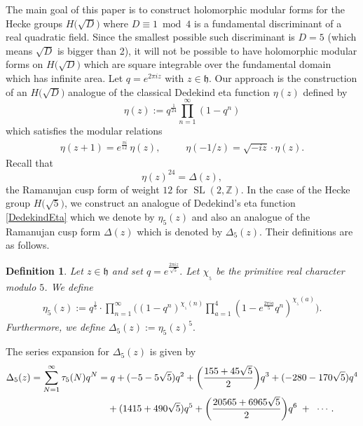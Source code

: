 \documentclass[11pt]{amsart}
\numberwithin{equation}{section}
\newtheorem{defn}[thm]{Definition}
\theoremstyle{remark}
\DeclareMathOperator{\SL}{SL}
\begin{document}
\par
The main goal of this paper is to construct holomorphic modular forms for the Hecke groups $H\big(\sqrt{D}\big)$  where $D\equiv 1 \bmod{4}$ is a fundamental discriminant of a real quadratic field. Since the smallest possible such discriminant is $D=5$ (which means $\sqrt{D}$ is bigger than 2), it will not be possible to have holomorphic modular forms on $H\big(\sqrt{D}\big)$ which are square integrable over the fundamental domain which has infinite area. Let
 $q = e^{2\pi iz}$ with $z\in\mathfrak h$. Our approach is the construction of an $H\big(\sqrt{D}\big)$ analogue of the classical Dedekind eta function $\eta(z)$ defined by
\begin{equation} \label{DedekindEta}
\eta(z) := q^{\frac{1}{24}}\prod_{n=1}^\infty \left(1-q^n \right)
\end{equation}
which satisfies the modular relations
\begin{align}\label{Eq: Classical Modular Relations}
\eta(z+1)  = e^{\frac{\pi i}{12}}\, \eta(z), \qquad\;\; \eta(-1/z)= \sqrt{-i z}\cdot \eta(z).
\end{align}
Recall that $$\eta(z)^{24} = \Delta(z),$$ the Ramanujan cusp form of weight $12$ for $\SL(2,\mathbb Z).$ In the case of the Hecke group $H\big(\sqrt{5}\big)$, we construct an analogue of Dedekind's eta function \eqref{DedekindEta} which we denote by $\eta_5(z)$ and also an analogue of the Ramanujan cusp form $\Delta(z)$ which is denoted by $\Delta_5(z).$  Their definitions are as follows.
\begin{defn} Let $z\in\mathfrak h$ and set $q = e^{\frac{2\pi i z}{\sqrt{5}}}.$ Let $\chi_{_5}$ be the primitive real character modulo $5$. We define
\begin{align}\label{Defn: eta5}
\eta_5(z) := q^{\frac15}\cdot \prod_{n=1}^\infty \bigg ((1-q^n )^{\chi_{_5}(n)} \prod_{a=1}^4 \left(1 - e^{\frac{2\pi i a}{5}}  q^n  \right)^{\chi_{_5}(a)}\bigg).
\end{align}
Furthermore, we define
$\Delta_5(z) := \eta_5(z)^5.$
\end{defn}

The series expansion for $\Delta_5(z)$ is given by
 \begin{align}\label{Delta5 Coefficients}
 \Delta_5(z)= \sum_{N=1}^\infty \tau_5(N) q^N &= q +(-5-5\sqrt{5})q^2 + \bigg( \frac{155+45\sqrt{5}}{2} \bigg)q^3 + (-280-170\sqrt{5})q^4 \notag \\
 &\quad + (1415+490\sqrt{5})q^5+\bigg ( \frac{20565+6965\sqrt{5}}{2}\bigg) q^6 \;+\;\; \cdots.
 \end{align}
\end{document}
